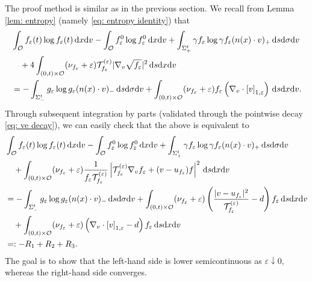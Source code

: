 \documentclass[10pt, reqno]{amsart}
\theoremstyle{plain}
\theoremstyle{definition}
\theoremstyle{remark}
\numberwithin{equation}{section}
\newcommand{\calO}{\mathcal O}
\newcommand{\calT}{\mathcal T}
\newcommand{\ve}{\varepsilon}
\newcommand{\dx}{\textnormal{d}x}
\newcommand{\dv}{\textnormal{d}v}
\newcommand{\ds}{\textnormal{d}s}
\newcommand{\tnd}{\textnormal{d}}
\newcommand{\lt}{\left}
\newcommand{\rt}{\right}
\newcommand{\renorm}[3]{\lt[#1\rt]_{#2 , #3}}
\begin{document}
The proof method is similar as in the previous section. We recall from Lemma \ref{lem: entropy} (namely \eqref{eq: entropy identity}) that
\begin{equation} \label{eq: ENT ve}
\begin{split}
    &\int_{\calO} f_\ve(t) \log f_\ve(t) \,\dx\dv - \int_{\calO} f_\ve^0 \log f_\ve^0 \,\dx\dv + \int_{\Sigma_+^t} \gamma f_\ve \log \gamma f_\ve (n(x)\cdot v)_+ \,\ds\tnd\sigma\dv \\
        &\quad + 4\int_{(0,t)\times\calO} (\nu_{f_\ve} + \ve) \calT_{f_\ve}^{(\ve)} |\nabla_v \sqrt{f_\ve}|^2 \,\ds\dx\dv\\
        &= -\int_{\Sigma_-^t} g_\ve \log g_\ve (n(x)\cdot v)_- \,\ds\tnd\sigma \dv + \int_{(0,t)\times \calO} (\nu_{f_\ve} + \ve) f_\ve \lt(\nabla_v\cdot \renorm{v}{1}{\ve}\rt) \,\ds\dx\dv.
\end{split}
\end{equation}
Through subsequent integration by parts (validated through the pointwise decay \eqref{eq: ve decay}), we can easily check that the above is equivalent to
\begin{equation} \label{eq: ENT EQUIV}
\begin{split}
    &\int_{\calO} f_\ve(t) \log f_\ve(t) \,\dx\dv - \int_{\calO} f_\ve^0 \log f_\ve^0 \,\dx\dv + \int_{\Sigma_+^t} \gamma f_\ve \log \gamma f_\ve (n(x)\cdot v)_+ \,\ds\tnd\sigma\dv\\ 
    &\quad + \int_{(0,t)\times \calO} (\nu_{f_\ve} + \ve) \frac{1}{f_\ve \calT_{f_\ve}^{(\ve)}} \lt| \calT_{f_\ve}^{(\ve)} \nabla_v f_\ve + (v-u_{f_\ve}) f \rt|^2 \,\ds\dx\dv\\
    &= - \int_{\Sigma_-^t} g_\ve \log g_\ve (n(x)\cdot v)_- \,\ds\tnd\sigma\dv   + \int_{(0,t)\times \calO} (\nu_{f_\ve} + \ve) \lt( \frac{|v-u_{f_\ve}|^2 }{\calT_{f_\ve}^{(\ve)}} - d \rt) f_\ve \,\ds\dx\dv  \\
    &\quad + \int_{(0,t)\times \calO} (\nu_{f_\ve} + \ve) \lt( \nabla_v\cdot \renorm{v}{1}{\ve} - d \rt) f_\ve \,\ds\dx\dv \\
    &=: -R_1 + R_2 + R_3.
\end{split}
\end{equation}
The goal is to show that the left-hand side is lower semicontinuous as $\ve\downarrow 0$, whereas the right-hand side converges.
\end{document}
